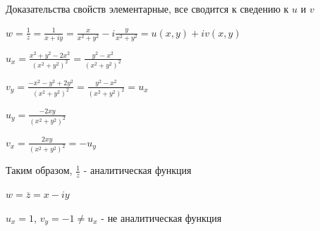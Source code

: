 \documentclass[12pt]{article}
\begin{document}
\Nota Доказательства свойств элементарные, все сводится к сведению к $u$ и $v$

\Ex $w = \frac{1}{z} = \frac{1}{x + iy} = \frac{x}{x^2 + y^2} - i \frac{y}{x^2 + y^2} = u(x, y) + i v(x, y)$

$u_x = \frac{x^2 + y^2 - 2x^2}{(x^2 + y^2)^2} = \frac{y^2 - x^2}{(x^2 + y^2)^2}$

$v_y = \frac{-x^2 - y^2 + 2y^2}{(x^2 + y^2)^2} = \frac{y^2 - x^2}{(x^2 + y^2)^2} = u_x$

$u_y = \frac{-2xy}{(x^2 + y^2)^2}$

$v_x = \frac{2xy}{(x^2 + y^2)^2} = -u_y$

Таким образом, $\frac{1}{z}$ - аналитическая функция

\Ex $w = \overline{z} = x - iy$

$u_x = 1$, $v_y = -1 \neq u_x$ - не аналитическая функция



\end{document}
